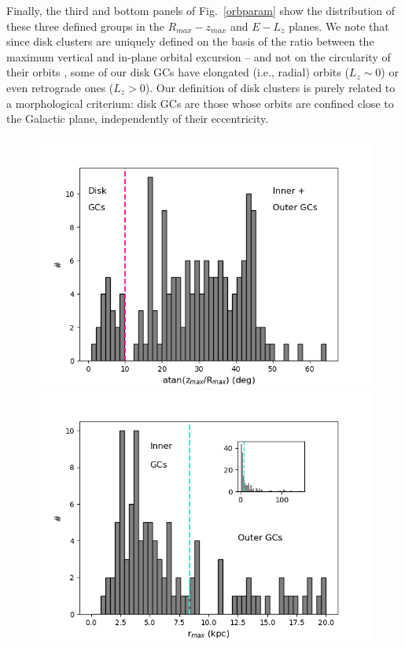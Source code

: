         Finally, the third and bottom panels of Fig.~\ref{orbparam}  show the distribution of these three defined groups in the $R_{max}-z_{max}$ and $E-L_z$ planes. We note that since disk clusters are uniquely defined on the basis of the ratio between the maximum vertical and in-plane orbital excursion -- and not on the circularity of their orbits \citep[as seen, e.g., in][]{2019A&A...630L...4M},  some of our disk GCs have elongated (i.e., radial) orbits ($L_z  \sim 0$) or even retrograde ones ($L_z > 0$). Our definition of disk clusters is purely related to a morphological criterium: disk GCs are those whose orbits are confined close to the Galactic plane, independently of their eccentricity.

        \twocolumn
        \begin{figure}
            \begin{center}
                \includegraphics[clip=true, trim = 0mm 0mm 0mm 0mm, width=0.7\columnwidth]{images/PII_orbitparams_atanRzmax.png}
                \includegraphics[clip=true, trim = 0mm 0mm 0mm 0mm, width=0.7\columnwidth]{images/PII_orbitparams_rmax_notD.png}


\end{center}
\end{figure}
